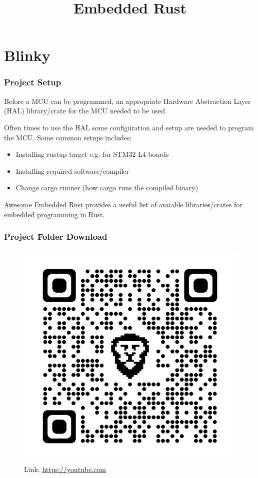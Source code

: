 \documentclass{beamer}
\title{Embedded Rust}
\begin{document}
\begin{frame}
  \titlepage{}
\end{frame}

\section{Blinky}
\begin{frame}
  \frametitle{Project Setup}
  Before a MCU can be programmed, an appropriate Hardware Abstraction Layer (HAL) library/crate for the MCU needed to be used.

  Often times to use the HAL some configuration and setup are needed to program the MCU. Some common setups includes:

  \begin{itemize}
    \item{Installing rustup target e.g.  for STM32 L4 boards}
    \item{Installing required software/compiler}
    \item{Change cargo runner (how cargo runs the compiled binary)}
  \end{itemize}

  \href{https://github.com/rust-embedded/awesome-embedded-rust}{Awesome Embedded Rust} provides a useful list of avaiable libraries/crates for embedded programming in Rust.
\end{frame}

\begin{frame}
  \frametitle{Project Folder Download}
  \begin{figure}
    \includegraphics[width=.47\textwidth]{qrcode.png}
    \caption{Link: \url{https://youtube.com}}
  \end{figure}
\end{frame}
\end{document}
